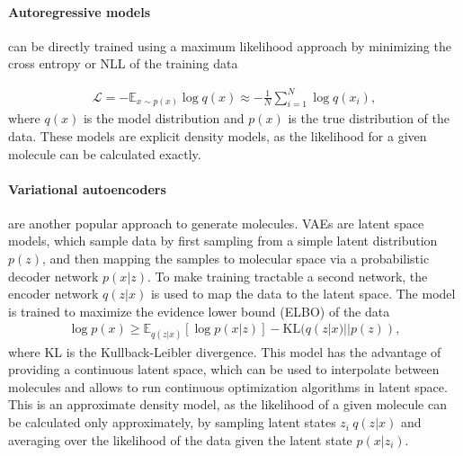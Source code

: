 \paragraph{Autoregressive models} can be directly trained using a maximum likelihood approach by
minimizing the cross entropy or \ac{NLL} of the training data

\begin{align}
      \mathcal{L} = - \mathbb{E}_{x \sim p(x)} \log q(x) \approx - \frac{1}{N} \sum_{i=1}^N \log q(x_i),
\end{align}
where $q(x)$ is the model distribution and $p(x)$ is the true distribution of the data. These models
are explicit density models, as the likelihood for a given molecule can be calculated exactly.

\paragraph{Variational autoencoders} are another popular approach to generate molecules. \Acp{VAE}
are latent space models, which sample data by first sampling from a simple latent distribution
$p(z)$, and then mapping the samples to molecular space via a probabilistic decoder network
$p(x|z)$. To make training tractable a second network, the encoder network $q(z|x)$ is used to map
the data to the latent space. The model is trained to maximize the evidence lower bound (ELBO) of
the data
\begin{align}
      \log p(x) \geq \mathbb{E}_{q(z|x)}[\log p(x|z)] - \text{KL}(q(z|x) || p(z)),
\end{align}
where KL is the Kullback-Leibler divergence. This model has the advantage of providing a continuous
latent space, which can be used to interpolate between molecules and allows to run continuous
optimization algorithms in latent space. This is an approximate density model, as the likelihood of
a given molecule can be calculated only approximately, by sampling latent states $z_i ~ q(z|x)$ and
averaging over the likelihood of the data given the latent state $p(x|z_i)$.


